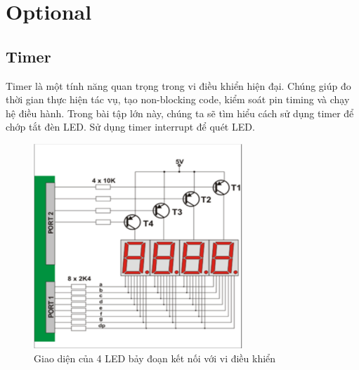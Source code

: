 \section{Optional}
\subsection{Timer}
Timer là một tính năng quan trọng trong vi điều khiển hiện đại. Chúng giúp đo thời gian thực hiện tác vụ, tạo non-blocking code, kiểm soát pin timing và chạy hệ điều hành. Trong bài tập lớn này, chúng ta sẽ tìm hiểu cách sử dụng timer để chớp tắt đèn LED. Sử dụng timer interrupt để quét LED.
\begin{figure}[h]
    \centering
    \includegraphics[width=0.7\textwidth]{graphics/LED_7seg.PNG}
    \caption{Giao diện của 4 LED bảy đoạn kết nối với vi điều khiển}
\end{figure}

